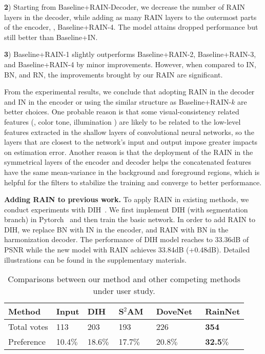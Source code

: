 \documentclass[final]{cvpr}
\begin{document}
\noindent
\textbf{2}) Starting from Baseline+RAIN-Decoder, we decrease the number of RAIN layers in the decoder, while adding as many RAIN layers to the outermost parts of the encoder, \ie, Baseline+RAIN-4. The model attains dropped performance but still better than Baseline+IN. 

\noindent
\textbf{3}) Baseline+RAIN-1 slightly outperforms Baseline+RAIN-2, Baseline+RAIN-3, and Baseline+RAIN-4 by minor improvements. However, when compared to IN, BN, and RN, the improvements brought by our RAIN are significant.

From the experimental results, we conclude that adopting RAIN in the decoder and IN in the encoder or using the similar structure as Baseline+RAIN-$k$ are better choices. One probable reason is that some visual-consistency related features (\eg, color tone, illumination \etc) are likely to be related to the low-level features extracted in the shallow layers of convolutional neural networks, so the layers that are closest to the network’s input and output impose greater impacts on estimation error. Another reason is that the deployment of the RAIN in the symmetrical layers of the encoder and decoder helps the concatenated features have the same mean-variance in the background and foreground regions, which is helpful for the filters to stabilize the training and converge to better performance.


\noindent
\textbf{Adding RAIN to previous work.} To apply RAIN in existing methods, we conduct experiments with DIH~\cite{tsai2017deep}. We first implement DIH (with segmentation branch) in Pytorch~\cite{paszke2017automatic} and then train the basic network. In order to add RAIN to DIH, we replace BN with IN in the encoder, and RAIN with BN in the harmonization decoder. The performance of DIH model reaches to 33.36dB of PSNR while the new model with RAIN achieves 33.84dB (+0.48dB). Detailed illustrations can be found in the supplementary materials.

\begin{table}
\footnotesize
\begin{center}
\begin{tabular}{p{1.3cm}<{\centering}p{0.6cm}<{\centering}p{0.8cm}<{\centering}p{1cm}<{\centering}p{1.1cm}<{\centering}p{1.0cm}<{\centering}}
\toprule
Method & Input & DIH~\cite{tsai2017deep} & S$^2$AM~\cite{cun2020improving} & DoveNet~\cite{cong2020dovenet} & RainNet\\
\midrule
Total votes & 113 & 203 & 193 & 226 & \textbf{354} \\
Preference & 10.4$\%$ & 18.6$\%$ & 17.7$\%$ & 20.8$\%$ & \textbf{32.5}$\%$ \\
\bottomrule
\end{tabular}
\end{center}
\caption{Comparisons between our method and other competing methods under user study.}
\label{tab:user_study}
\end{table}
\end{document}
